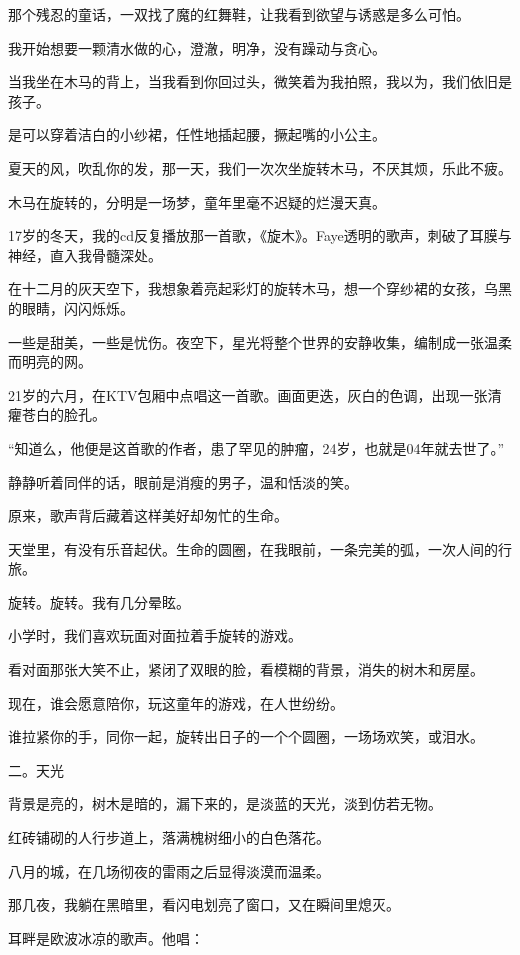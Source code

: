 \documentclass[12pt,a4paper]{article}
\def\blankrev{\vspace{1ex}}									%
\newcommand{\subpart}[1]{
	\begingroup \par
	\vspace{1ex} \centering #1
	\par \endgroup
}
\begin{document}
		\blankrev
		那个残忍的童话，一双找了魔的红舞鞋，让我看到欲望与诱惑是多么可怕。\par
		我开始想要一颗清水做的心，澄澈，明净，没有躁动与贪心。\par
		当我坐在木马的背上，当我看到你回过头，微笑着为我拍照，我以为，我们依旧是孩子。\par
		是可以穿着洁白的小纱裙，任性地插起腰，撅起嘴的小公主。\par
		夏天的风，吹乱你的发，那一天，我们一次次坐旋转木马，不厌其烦，乐此不疲。\par
		木马在旋转的，分明是一场梦，童年里毫不迟疑的烂漫天真。\par
		17岁的冬天，我的cd反复播放那一首歌，《旋木》。Faye透明的歌声，刺破了耳膜与神经，直入我骨髓深处。\par
		在十二月的灰天空下，我想象着亮起彩灯的旋转木马，想一个穿纱裙的女孩，乌黑的眼睛，闪闪烁烁。\par
		一些是甜美，一些是忧伤。夜空下，星光将整个世界的安静收集，编制成一张温柔而明亮的网。\par
		21岁的六月，在KTV包厢中点唱这一首歌。画面更迭，灰白的色调，出现一张清癯苍白的脸孔。\par
		“知道么，他便是这首歌的作者，患了罕见的肿瘤，24岁，也就是04年就去世了。”\par
		静静听着同伴的话，眼前是消瘦的男子，温和恬淡的笑。\par
		原来，歌声背后藏着这样美好却匆忙的生命。\par
		天堂里，有没有乐音起伏。生命的圆圈，在我眼前，一条完美的弧，一次人间的行旅。\par
		旋转。旋转。我有几分晕眩。\par
		小学时，我们喜欢玩面对面拉着手旋转的游戏。\par
		看对面那张大笑不止，紧闭了双眼的脸，看模糊的背景，消失的树木和房屋。\par
		现在，谁会愿意陪你，玩这童年的游戏，在人世纷纷。\par
		谁拉紧你的手，同你一起，旋转出日子的一个个圆圈，一场场欢笑，或泪水。


		\subpart{二。天光}

		背景是亮的，树木是暗的，漏下来的，是淡蓝的天光，淡到仿若无物。\par
		红砖铺砌的人行步道上，落满槐树细小的白色落花。\par
		八月的城，在几场彻夜的雷雨之后显得淡漠而温柔。\par
		那几夜，我躺在黑暗里，看闪电划亮了窗口，又在瞬间里熄灭。\par
		耳畔是欧波冰凉的歌声。他唱：
\end{document}
